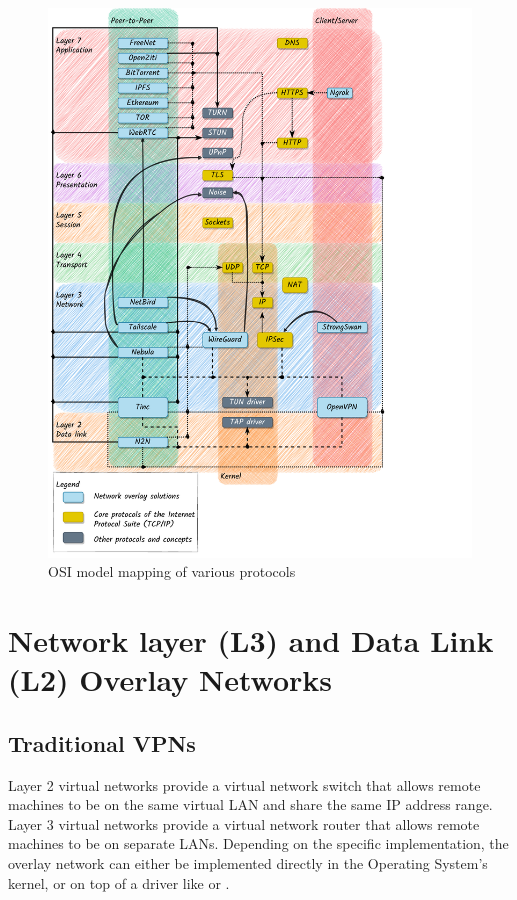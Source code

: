 \begin{figure}
\centering
\includegraphics[width=\textwidth,height=0.9\textheight]{thesis/../figures/osi-map-overlays.drawio.pdf}
\caption{OSI model mapping of various protocols
\label{osi-map-overlays}}
\end{figure}

\hypertarget{network-layer-l3-and-data-link-l2-overlay-networks}{%
\section{Network layer (L3) and Data Link (L2) Overlay
Networks}\label{network-layer-l3-and-data-link-l2-overlay-networks}}

\hypertarget{traditional-vpns}{%
\subsection{Traditional VPNs}\label{traditional-vpns}}

Layer 2 virtual networks provide a virtual network switch that allows
remote machines to be on the same virtual LAN and share the same IP
address range. Layer 3 virtual networks provide a virtual network router
that allows remote machines to be on separate LANs. Depending on the
specific implementation, the overlay network can either be implemented
directly in the Operating System's kernel, or on top of a driver like
 or .

